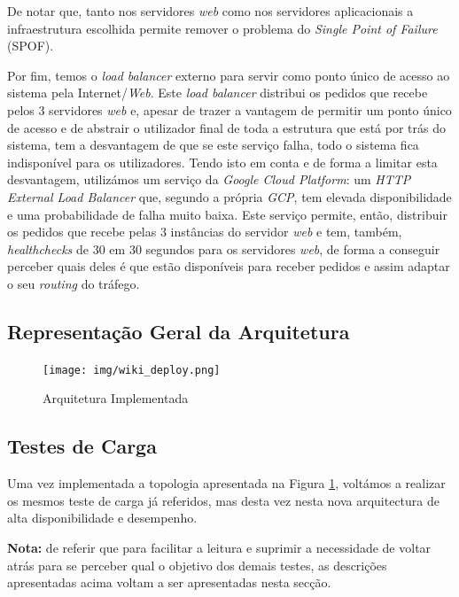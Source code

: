 De notar que, tanto nos servidores \textit{web} como nos servidores aplicacionais a infraestrutura escolhida permite remover o problema do \textit{Single Point of Failure} (SPOF).

Por fim, temos o \textit{load balancer} externo para servir como ponto único de acesso ao sistema pela Internet/\textit{Web}. Este \textit{load balancer} distribui os pedidos que recebe pelos 3 servidores \textit{web} e, apesar de trazer a vantagem de permitir um ponto único de acesso e de abstrair o utilizador final de toda a estrutura que está por trás do sistema, tem a desvantagem de que se este serviço falha, todo o sistema fica indisponível para os utilizadores. Tendo isto em conta e de forma a limitar esta desvantagem, utilizámos um serviço da \textit{Google Cloud Platform}: um \textit{HTTP External Load Balancer} que, segundo a própria \textit{GCP}, tem elevada disponibilidade e uma probabilidade de falha muito baixa. Este serviço permite, então, distribuir os pedidos que recebe pelas 3 instâncias do servidor \textit{web} e tem, também, \textit{healthchecks} de 30 em 30 segundos para os servidores \textit{web}, de forma a conseguir perceber quais deles é que estão disponíveis para receber pedidos e assim adaptar o seu \textit{routing} do tráfego.

\subsection{Representação Geral da Arquitetura}

\begin{figure}[h!]
    \centering
    \texttt{[image: img/wiki\_deploy.png]}
    \caption{Arquitetura Implementada}
    \label{fig:final-arch}
\end{figure}


\subsection{Testes de Carga}

Uma vez implementada a topologia apresentada na Figura \ref{fig:final-arch}, voltámos a realizar os mesmos teste de carga já referidos, mas desta vez nesta nova arquitectura de alta disponibilidade e desempenho.

\textbf{Nota:} de referir que para facilitar a leitura e suprimir a necessidade de voltar atrás para se perceber qual o objetivo dos demais testes, as descrições apresentadas acima voltam a ser apresentadas nesta secção.

